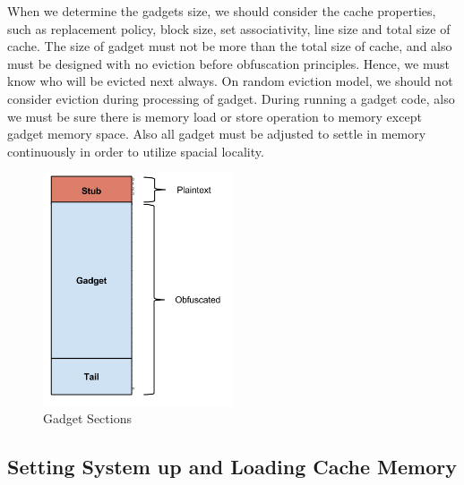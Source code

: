 	    When we determine the gadgets size, we should consider the cache properties, such as replacement policy, block size, set associativity, line size and total size of cache. The size of gadget must not be more than the total size of cache, and also must be designed with no eviction before obfuscation principles. Hence, we must know who will be evicted next always. On random eviction model, we should not consider eviction during processing of gadget. During running a gadget code, also we must be sure there is memory load or store operation to memory except gadget memory space. Also all gadget must be adjusted to settle in memory continuously in order to utilize spacial locality.

	    \begin{figure}[h!]
	        \centering
	        \includegraphics[width=0.5\textwidth]{img/Code_illustration.png}
	        \caption{Gadget Sections}
	        \label{fig:gadgetsections}
	    \end{figure}

 	    \subsection{Setting System up and Loading Cache Memory} 

